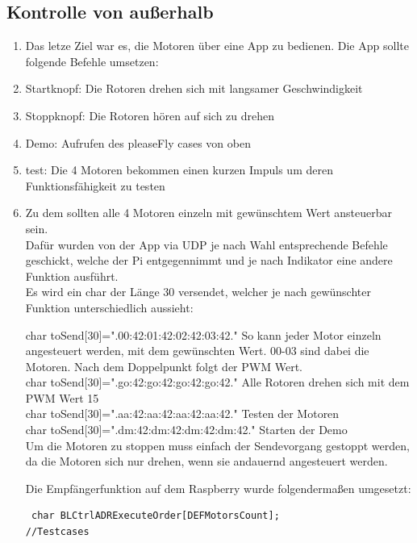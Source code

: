 \documentclass{article}
\begin{document}
\subsection{Kontrolle von außerhalb}

\begin{enumerate}
\item[]Das letze Ziel war es, die Motoren über eine App zu bedienen. Die App sollte folgende Befehle umsetzen:\\
\item Startknopf: Die Rotoren drehen sich mit langsamer Geschwindigkeit
\item Stoppknopf: Die Rotoren hören auf sich zu drehen
\item Demo:	Aufrufen des pleaseFly cases von oben
\item test: Die 4 Motoren bekommen einen kurzen Impuls um deren Funktionsfähigkeit zu testen
\item[] Zu dem sollten alle 4 Motoren einzeln mit gewünschtem Wert ansteuerbar sein.\\

Dafür wurden von der App via UDP je nach Wahl entsprechende Befehle geschickt, welche der Pi entgegennimmt und je nach Indikator eine andere Funktion ausführt.\\

Es wird ein char der Länge 30 versendet, welcher je nach gewünschter Funktion unterschiedlich aussieht:

char toSend[30]=".00:42:01:42:02:42:03:42." So kann jeder Motor einzeln angesteuert werden, mit dem gewünschten Wert. 00-03 sind dabei die Motoren. Nach dem Doppelpunkt folgt der PWM Wert.\\

char toSend[30]=".go:42:go:42:go:42:go:42." Alle Rotoren drehen sich mit dem PWM Wert 15\\

char toSend[30]=".aa:42:aa:42:aa:42:aa:42." Testen der Motoren\\

char toSend[30]=".dm:42:dm:42:dm:42:dm:42." Starten der Demo\\

Um die Motoren zu stoppen muss einfach der Sendevorgang gestoppt werden, da die Motoren sich nur drehen, wenn sie andauernd angesteuert werden.

Die Empfängerfunktion auf dem Raspberry wurde folgendermaßen umgesetzt:\\

\begin{verbatim}
 char BLCtrlADRExecuteOrder[DEFMotorsCount];
//Testcases


\end{verbatim}
\end{enumerate}
\end{document}
